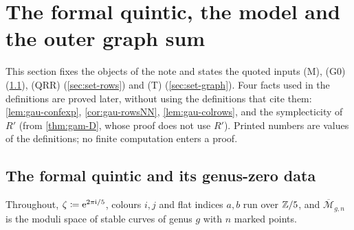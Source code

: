 \section{The formal quintic, the model and the outer graph sum}
\label{sec:set}

This section fixes the objects of the note and states the quoted inputs (M), (G0) (\cref{sec:set-fq}), (QRR) (\cref{sec:set-rows}) and (T) (\cref{sec:set-graph}). Four facts used in the definitions are proved later, without using the definitions that cite them: \cref{lem:gau-confexp}, \cref{cor:gau-rowsNN}, \cref{lem:gau-colrows}, and the symplecticity of $R'$ (from \cref{thm:gam-D}, whose proof does not use $R'$). Printed numbers are values of the definitions; no finite computation enters a proof.

\subsection{The formal quintic and its genus-zero data}
\label{sec:set-fq}

Throughout, $\zeta\coloneqq\mathrm{e}^{2\pi\mathrm{i}/5}$, colours $i,j$ and flat indices $a,b$ run over $\mathbb{Z}/5$, and $\overline{\mathcal M}_{g,n}$ is the moduli space of stable curves of genus $g$ with $n$ marked points.

